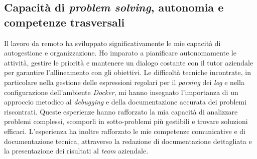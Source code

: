 \subsection*{Capacità di \textit{problem solving}, autonomia e competenze trasversali}
Il lavoro da remoto ha sviluppato significativamente le mie capacità di autogestione e organizzazione. Ho imparato a pianificare autonomamente le attività, gestire le priorità e mantenere un dialogo costante con il tutor aziendale per garantire l'allineamento con gli obiettivi.
Le difficoltà tecniche incontrate, in particolare nella gestione delle espressioni regolari per il \textit{parsing} dei \textit{log} e nella configurazione dell'ambiente \textit{Docker}, mi hanno insegnato l'importanza di un approccio metodico al \textit{debugging} e della documentazione accurata dei problemi riscontrati. Queste esperienze hanno rafforzato la mia capacità di analizzare problemi complessi, scomporli in sotto-problemi più gestibili e trovare soluzioni efficaci.
L'esperienza ha inoltre rafforzato le mie competenze comunicative e di documentazione tecnica, attraverso la redazione di documentazione dettagliata e la presentazione dei risultati al \textit{team} aziendale.